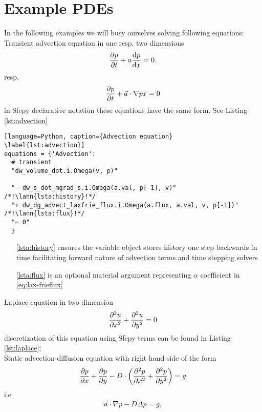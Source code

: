 \section{Example PDEs}
In the following examples we will busy ourselves solving following equations:\\
Transient advection equation in one resp. two dimensions
\begin{equation}
	\label{eq:ex_advection}
	\frac{\partial p}{\partial t} + a\frac{\text{d}p}{\text{d}x} = 0.
\end{equation}
resp.
\begin{equation}
	\frac{\partial p}{\partial t} + \vec{a}\cdot\nabla{p}{x} = 0
\end{equation}
in Sfepy declarative notation these equations have the same form. See Listing 
\ref{lst:advection}
\setcounter{lstannotation}{0}
\begin{lstlisting}[language=Python, caption={Advection equation}
\label{lst:advection}]
equations = {'Advection': 
  # transient
  "dw_volume_dot.i.Omega(v, p)"
 
  "- dw_s_dot_mgrad_s.i.Omega(a.val, p[-1], v)" /*!\lann{lsta:history}!*/
  "+ dw_dg_advect_laxfrie_flux.i.Omega(a.flux, a.val, v, p[-1])"  /*!\lann{lsta:flux}!*/
  "= 0"
  }
\end{lstlisting}
\begin{itemize}
	\item[\ref{lsta:history}]  ensures the variable object stores 
	history one step backwards in time facilitating forward nature of advection terms and 
	time stepping solvers
	\item[\ref{lsta:flux}]  is an optional material argument 
	representing $\alpha$ coefficient in \eqref{eq:lax-frieflux}
\end{itemize}
Laplace equation in two dimension
\begin{equation}
	\label{eq:ex_laplace}
	\frac{\partial^2 u}{\partial x^2} + \frac{\partial^2 u}{\partial y^2} = 0
\end{equation}
discretization of this equation using Sfepy terms can be found in Listing 
\ref{lst:laplace};\\
Static advection-diffusion equation with right hand side of the form
\begin{equation}
\label{eq:ex_advdiff}
\frac{\partial p}{\partial x} + \frac{\partial p}{\partial y} - D \cdot \left( \frac{\partial^2 p}{\partial x^2} + \frac{\partial^2 
p}{\partial y^2} \right) = g
\end{equation}
i.e
\begin{equation}
\vec{a} \cdot \nabla p - D \Delta p = g,
\end{equation}
